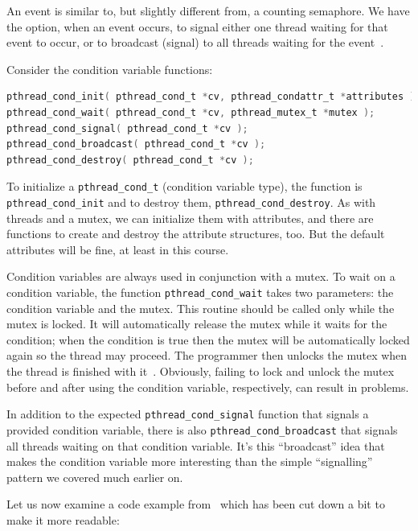 \documentclass[a4paper]{report}
\begin{document}
An event is similar to, but slightly different from, a counting semaphore. We have the option, when an event occurs, to signal either one thread waiting for that event to occur, or to broadcast (signal) to all threads waiting for the event~\cite{mte241}.

Consider the condition variable functions:

\begin{lstlisting}[language=C]
pthread_cond_init( pthread_cond_t *cv, pthread_condattr_t *attributes );
pthread_cond_wait( pthread_cond_t *cv, pthread_mutex_t *mutex );
pthread_cond_signal( pthread_cond_t *cv );
pthread_cond_broadcast( pthread_cond_t *cv );
pthread_cond_destroy( pthread_cond_t *cv );
\end{lstlisting}

To initialize a \texttt{pthread\_cond\_t} (condition variable type), the function is \texttt{pthread\_cond\_init} and to destroy them, \texttt{pthread\_cond\_destroy}. As with threads and a mutex, we can initialize them with attributes, and there are functions to create and destroy the attribute structures, too. But the default attributes will be fine, at least in this course.

Condition variables are always used in conjunction with a mutex. To wait on a condition variable, the function \texttt{pthread\_cond\_wait} takes two parameters: the condition variable and the mutex. This routine should be called only while the mutex is locked. It will automatically release the mutex while it waits for the condition; when the condition is true then the mutex will be automatically locked again so the thread may proceed. The programmer then unlocks the mutex when the thread is finished with it~\cite{pthreads}. Obviously, failing to lock and unlock the mutex before and after using the condition variable, respectively, can result in problems.

In addition to the expected \texttt{pthread\_cond\_signal} function that signals a provided condition variable, there is also \texttt{pthread\_cond\_broadcast} that signals all threads waiting on that condition variable. It's this ``broadcast'' idea that makes the condition variable more interesting than the simple ``signalling'' pattern we covered much earlier on.


Let us now examine a code example from~\cite{pthreads} which has been cut down a bit to make it more readable:
\end{document}
